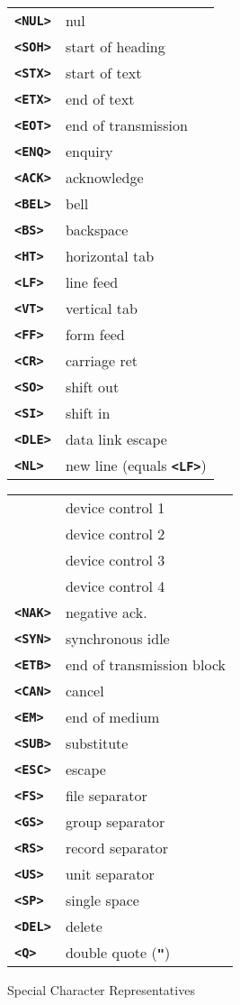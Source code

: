 \documentclass[12pt]{article}
\makeatletter
\newcommand{\TT}[1]{{\tt \bfseries #1}}
\newcommand{\tttkey}[1]{\TT{<#1>}\index{#1@{\tt <#1>}}}
\newlength{\figurewidth}
\newenvironment{boxedfigure}[1][!btp]%
	{\begin{figure*}[#1]
	 \begin{lrbox}{\figurebox}
	 \begin{minipage}{\figurewidth}

	 \vspace*{1ex}}%
	{
	 \vspace*{1ex}

	 \end{minipage}
	 \end{lrbox}
	 \begin{center}
	 \fbox{\hspace*{0.1in}\usebox{\figurebox}\hspace*{0.1in}}
	 \end{center}
	 \end{figure*}}
\makeatother
\begin{document}
\begin{boxedfigure}[!t]

\begin{center}
\begin{tabular}{lp{2in}}
\tttkey{NUL} & nul \\
\tttkey{SOH} & start of heading \\
\tttkey{STX} & start of text \\
\tttkey{ETX} & end of text \\
\tttkey{EOT} & end of transmission \\
\tttkey{ENQ} & enquiry \\
\tttkey{ACK} & acknowledge \\
\tttkey{BEL} & bell \\
\tttkey{BS}  & backspace \\
\tttkey{HT}  & horizontal tab \\
\tttkey{LF}  & line feed \\
\tttkey{VT}  & vertical tab \\
\tttkey{FF}  & form feed \\
\tttkey{CR}  & carriage ret \\
\tttkey{SO}  & shift out \\
\tttkey{SI}  & shift in \\
\tttkey{DLE} & data link escape
\\[1ex]
\tttkey{NL}  & new line (equals \TT{<LF>}) \\
\end{tabular}
\begin{tabular}{lp{2in}}
\tttkey{DC1} & device control 1 \\
\tttkey{DC2} & device control 2 \\
\tttkey{DC3} & device control 3 \\
\tttkey{DC4} & device control 4 \\
\tttkey{NAK} & negative ack. \\
\tttkey{SYN} & synchronous idle \\
\tttkey{ETB} & end of transmission block \\
\tttkey{CAN} & cancel \\
\tttkey{EM}  & end of medium \\
\tttkey{SUB} & substitute \\
\tttkey{ESC} & escape \\
\tttkey{FS}  & file separator \\
\tttkey{GS}  & group separator \\
\tttkey{RS}  & record separator \\
\tttkey{US}  & unit separator \\
\tttkey{SP}  & single space \\
\tttkey{DEL} & delete
\\[1ex]
\tttkey{Q}  & double quote (\TT{"}) \\
\end{tabular}
\end{center}

\caption{Special Character Representatives}
\label{SPECIAL-CHARACTER-REPRESENTATIVES}
\end{boxedfigure}
\end{document}
